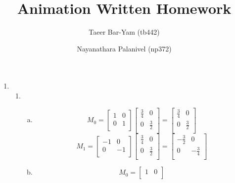 \documentclass[11pt, oneside]{article}
\title{Animation Written Homework}
\author{Taeer Bar-Yam (tb442) \and Nayanathara Palanivel (np372)}
\begin{document}
\maketitle

\begin{enumerate}[Problem 1:]

  \item
    \begin{enumerate}[1.]
      \item
        \begin{enumerate}[a)]
          \item
            \[
              M_0 = 
              \begin{bmatrix}
                1 & 0\\
                0 & 1\\
              \end{bmatrix}
              \begin{bmatrix}
                \frac 3 4 & 0\\
                0 & \frac 3 2\\
              \end{bmatrix}
              =
              \begin{bmatrix}
                \frac 3 4 & 0\\
                0 & \frac 3 2\\
              \end{bmatrix}
            \]
            \[
              M_1 = 
              \begin{bmatrix}
                -1 & 0\\
                0 & -1\\
              \end{bmatrix}
              \begin{bmatrix}
                \frac 3 4 & 0\\
                0 & \frac 3 2\\
              \end{bmatrix}
              =
              \begin{bmatrix}
                -\frac 3 2 & 0\\
                0 & -\frac 3 4\\
              \end{bmatrix}
            \]
          \item
            \[
              M_0 = 
              \begin{bmatrix}
                1 & 0\\

\end{bmatrix}\]
\end{enumerate}
\end{enumerate}
\end{enumerate}
\end{document}

